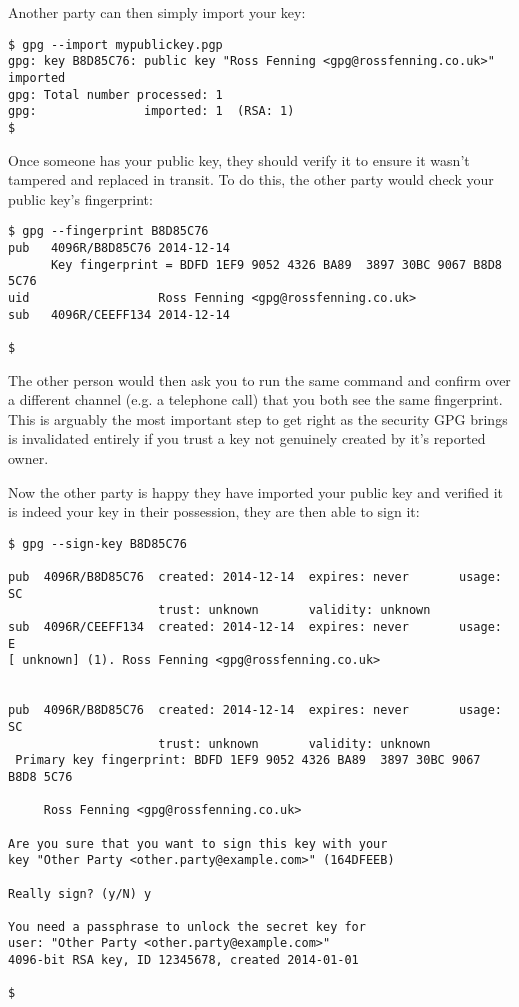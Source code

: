 \documentclass{report}
\begin{document}
Another party can then simply import your key:

\begin{lstlisting}
$ gpg --import mypublickey.pgp
gpg: key B8D85C76: public key "Ross Fenning <gpg@rossfenning.co.uk>" imported
gpg: Total number processed: 1
gpg:               imported: 1  (RSA: 1)
$
\end{lstlisting}

Once someone has your public key, they should verify it to ensure
it wasn't tampered and replaced in transit. To do this, the other
party would check your public key's fingerprint:

\begin{lstlisting}
$ gpg --fingerprint B8D85C76
pub   4096R/B8D85C76 2014-12-14
      Key fingerprint = BDFD 1EF9 9052 4326 BA89  3897 30BC 9067 B8D8 5C76
uid                  Ross Fenning <gpg@rossfenning.co.uk>
sub   4096R/CEEFF134 2014-12-14

$

\end{lstlisting}

The other person would then ask you to run the same command and confirm
over a different channel (e.g. a telephone call) that you both see
the same fingerprint. This is arguably the most important step to get
right as the security GPG brings is invalidated entirely if you
trust a key not genuinely created by it's reported owner.

Now the other party is happy they have imported your public key and
verified it is indeed your key in their possession, they are then
able to sign it:

\begin{lstlisting}
$ gpg --sign-key B8D85C76

pub  4096R/B8D85C76  created: 2014-12-14  expires: never       usage: SC  
                     trust: unknown       validity: unknown
sub  4096R/CEEFF134  created: 2014-12-14  expires: never       usage: E   
[ unknown] (1). Ross Fenning <gpg@rossfenning.co.uk>


pub  4096R/B8D85C76  created: 2014-12-14  expires: never       usage: SC  
                     trust: unknown       validity: unknown
 Primary key fingerprint: BDFD 1EF9 9052 4326 BA89  3897 30BC 9067 B8D8 5C76

     Ross Fenning <gpg@rossfenning.co.uk>

Are you sure that you want to sign this key with your
key "Other Party <other.party@example.com>" (164DFEEB)

Really sign? (y/N) y

You need a passphrase to unlock the secret key for
user: "Other Party <other.party@example.com>"
4096-bit RSA key, ID 12345678, created 2014-01-01

$
\end{lstlisting}
\end{document}
